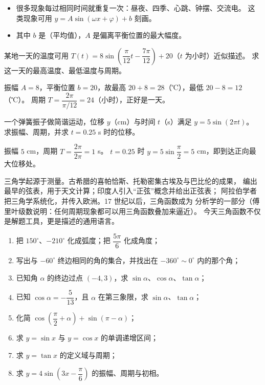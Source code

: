 \begin{explore}
\begin{itemize}
  \item 很多现象每过相同时间就重复一次：昼夜、四季、心跳、钟摆、交流电。
        这类现象可用 $y=A\sin(\omega x+\varphi)+b$ 刻画。
  \item 其中 $b$ 是（平均值），$A$ 是偏离平衡位置的最大幅度。
\end{itemize}

\begin{example}
某地一天的温度可用 $T(t)=8\sin\left(\dfrac{\pi}{12}t-\dfrac{7\pi}{12}\right)+20$（$t$ 为小时）近似描述。
求这一天的最高温度、最低温度与周期。
\end{example}
\begin{solution}
振幅 $A=8$，平衡位置 $b=20$，故最高 $20+8=28$（℃），最低 $20-8=12$（℃）。
周期 $T=\dfrac{2\pi}{\pi/12}=24$（小时），正好是一天。
\end{solution}

\begin{problem}
一个弹簧振子做简谐运动，位移 $y$（cm）与时间 $t$（s）满足 $y=5\sin(2\pi t)$。
求振幅、周期，并求 $t=0.25$ s 时的位移。
\end{problem}
\begin{solution}
振幅 $5$ cm，周期 $T=\dfrac{2\pi}{2\pi}=1$ s。
$t=0.25$ 时 $y=5\sin\dfrac{\pi}{2}=5$ cm，即到达正向最大位移处。
\end{solution}

三角学起源于测量。古希腊的喜帕恰斯、托勒密集古埃及与巴比伦的成果，
编出最早的弦表，用于天文计算；印度人引入“正弦”概念并给出正弦表；
阿拉伯学者把三角学系统化，并传入欧洲。17 世纪以后，三角函数成为
分析学的一部分（傅里叶级数说明：任何周期现象都可以用三角函数叠加来逼近）。
今天三角函数不仅是解题工具，更是描述的通用语言。

\end{explore}

\begin{inclasstest}
\begin{enumerate}
  \item 把 $150^\circ$、$-210^\circ$ 化成弧度；把 $\dfrac{5\pi}{6}$ 化成角度；
  \item 写出与 $-60^\circ$ 终边相同的角的集合，并找出在 $-360^\circ\sim0^\circ$ 内的那个角；
  \item 已知角 $\alpha$ 的终边过点 $(-4,3)$，求 $\sin\alpha$、$\cos\alpha$、$\tan\alpha$；
  \item 已知 $\cos\alpha=-\dfrac{5}{13}$，且 $\alpha$ 在第三象限，求 $\sin\alpha$、$\tan\alpha$；
  \item 化简 $\cos\left(\dfrac{\pi}{2}+\alpha\right)+\sin(\pi-\alpha)$；
  \item 求 $y=\sin x$ 与 $y=\cos x$ 的单调递增区间；
  \item 求 $y=\tan x$ 的定义域与周期；
  \item 求 $y=4\sin\left(3x-\dfrac{\pi}{6}\right)$ 的振幅、周期与初相。
\end{enumerate}
\end{inclasstest}

